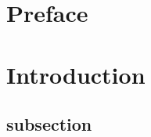 \setlength{\parindent}{2em} 
\section{Preface}
\section{Introduction}
\subsection{subsection}

\lipsum[1] \parencite{Morrison2012}

